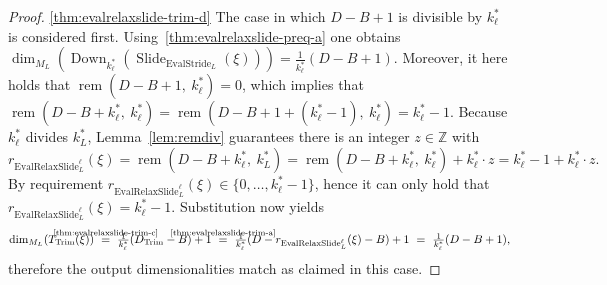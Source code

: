 \documentclass[journal]{IEEEtran}
\newcommand{\Z}{\mathbb{Z}}
\newcommand{\ROI}{B}
\newcommand{\discint}[2]{\{#1,\dotsc,#2\}}
\newcommand{\inint}[2]{\in\discint{#1}{#2}}
\DeclareMathOperator{\Slide}{Slide}
\DeclareMathOperator{\EvalStride}{EvalStride}
\DeclareMathOperator{\Trimming}{Trim}
\newcommand{\rem}[2]{\operatorname{rem}(#1,\ #2)}
\newcommand{\equsing}[1]{\overset{\mathclap{\text{#1}}}{=}}
\DeclareMathOperator{\EvalRelaxSlide}{EvalRelaxSlide}
\DeclareMathOperator{\Downsampling}{Down}
\begin{document}
\begin{proof}
\ref{thm:evalrelaxslide-trim-d}
The case in which $D - \ROI + 1$ is divisible by $k_\ell^*$ is considered first.
Using~\ref{thm:evalrelaxslide-preq-a} one obtains $\dim_{M_L}( \Downsampling_{k_\ell^*}( \Slide_{\EvalStride_L}(\xi) ) ) = \frac{1}{k_\ell^*}( D - \ROI + 1 )$.
Moreover, it here holds that $\rem{D - \ROI + 1}{k_\ell^*} = 0$, which implies that $\rem{D - \ROI + k_\ell^*}{k_\ell^*} = \rem{D - \ROI + 1 + (k_\ell^* - 1)}{k_\ell^*} = k_\ell^* - 1$.
Because $k_\ell^*$ divides $k_L^*$, Lemma~\ref{lem:remdiv} guarantees there is an integer $z\in\Z$ with
\begin{displaymath}
  r_{\EvalRelaxSlide_L^\ell}(\xi) = \rem{D - \ROI + k_\ell^*}{k_L^*} = \rem{D - \ROI + k_\ell^*}{k_\ell^*} + k_\ell^*\cdot z = k_\ell^* - 1 + k_\ell^*\cdot z\text{.}
\end{displaymath}
By requirement $r_{\EvalRelaxSlide_L^\ell}(\xi)\inint{0}{k_\ell^* - 1}$, hence it can only hold that $r_{\EvalRelaxSlide_L^\ell}(\xi) = k_\ell^* - 1$.
Substitution now yields
\begin{displaymath}
  \dim_{M_L}( T_{\Trimming}(\xi) )
  \ \equsing{\ref{thm:evalrelaxslide-trim-c}}\ \tfrac{1}{k_\ell^*}(D_{\Trimming} - \ROI) + 1
  \ \equsing{\ref{thm:evalrelaxslide-trim-a}}\ \tfrac{1}{k_\ell^*}(D - r_{\EvalRelaxSlide_L^\ell}(\xi) - \ROI) + 1
  \ =\ \tfrac{1}{k_\ell^*}( D - \ROI + 1 )\text{,}
\end{displaymath}
therefore the output dimensionalities match as claimed in this case.


\end{proof}
\end{document}
